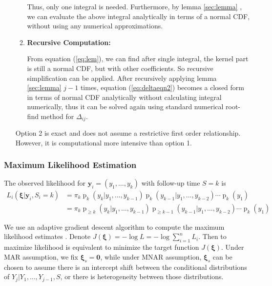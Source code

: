 \documentclass[12pt]{article}
\DeclareMathOperator{\pr}{p}
\begin{document}
\begin{itemize}
\begin{enumerate}
    Thus, only one integral is needed. Furthermore, by lemma
    \ref{sec:lemma} , we can evaluate the above integral analytically
    in terms of a normal CDF, without using any numerical
    approximations.

  \item \textbf{Recursive Computation: }

    From equation (\ref{eq:lem}), we can find after single integral,
    the kernel part is still a normal CDF, but with other
    coefficients. So recursive simplification can be applied. After
    recursively applying lemma \ref{sec:lemma} $j - 1$ times, equation
    (\ref{eq:deltaeqn2}) becomes a closed form in terms of normal CDF
    analytically without calculating integral numerically, thus it can
    be solved again using standard numerical root-find method for
    $\Delta_{ij}$.
  \end{enumerate}

  Option 2 is exact and does not assume a restrictive first order
  relationship.  However, it is computational more intensive than
  option 1.

\end{itemize}

\subsubsection{Maximum Likelihood Estimation}
\label{sec:mle}

The observed likelihood for $\bm y_i = (y_1, \ldots, y_k)$ with
follow-up time $S = k$ is
\begin{align} \label{eq:ll} L_i(\bm \xi| \bm y_i, S_{i} = k) & =
  \pi_k\pr_k (y_k | y_1, \ldots, y_{k-1})
  \pr_k (y_{k-1}|y_1, \ldots, y_{k-2}) \cdots \pr_{k} (y_1) \\
  & = \pi_k \pr_{\geq k} (y_k | y_1, \ldots, y_{k-1}) \pr_{\geq k-1}
  (y_{k-1}|y_1, \ldots, y_{k-2}) \cdots \pr_{k} (y_1) \nonumber
\end{align}

We use an adaptive gradient descent algorithm to compute the maximum
likelihood estimates \citep{ried1993}. Denote $J(\bm \xi) = - \log L =
- \log \sum_{i = 1}^n L_i$.  Then to maximize likelihood is equivalent
to minimize the target function $J(\bm \xi)$. Under MAR assumption, we
fix $\bm \xi_s = \bm 0$, while under MNAR assumption, $\bm \xi_s $ can
be chosen to assume there is an intercept shift between the
conditional distributions of $Y_{j}| Y_{1}, \ldots, Y_{j-1}, S$, or
there is heterogeneity between those distributions.
\end{document}
